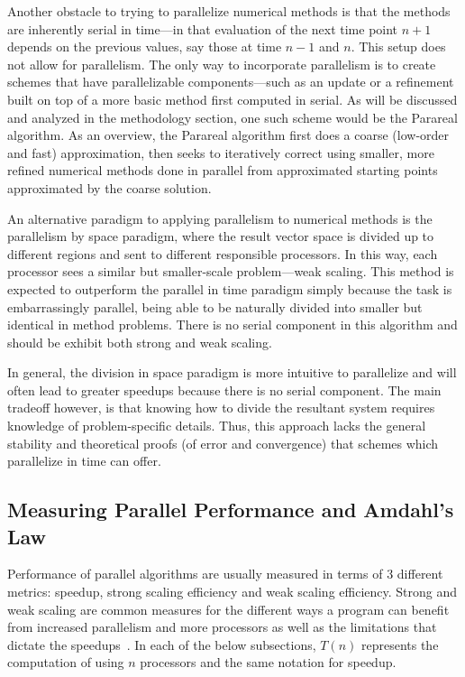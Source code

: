 \documentclass[letterpaper,12pt]{article}
\begin{document}
Another obstacle to trying to parallelize numerical methods is that the methods
are inherently serial in time---in that evaluation of the next time point $n+1$
depends on the previous values, say those at time $n-1$ and $n$. This setup
does not allow for parallelism. The only way to incorporate parallelism is to
create schemes that have parallelizable components---such as an update or a
refinement built on top of a more basic method first computed in serial. As will be discussed and analyzed in the
methodology section, one such scheme would be the Parareal algorithm. As an
overview, the Parareal algorithm first does a coarse (low-order and fast)
approximation, then seeks to iteratively correct using smaller, more refined
numerical methods done in parallel from approximated starting points
approximated by the coarse solution.

An alternative paradigm to applying parallelism to numerical methods is the
parallelism by space paradigm, where the result vector space is divided up to
different regions and sent to different responsible processors. In this way,
each processor sees a similar but smaller-scale problem---weak scaling. This
method is expected to outperform the parallel in time paradigm simply because
the task is embarrassingly parallel, being able to be naturally divided
into smaller but identical in method problems. There is no serial component in
this algorithm and should be exhibit both strong and weak scaling.

In general, the division in space paradigm is more intuitive to parallelize and
will often lead to greater speedups because there is no serial component. The main tradeoff however, is that knowing how to divide the resultant system requires knowledge of problem-specific details. Thus, this approach lacks the
general stability and theoretical proofs (of error and convergence) that schemes which parallelize in
time can offer.

\subsection{Measuring Parallel Performance and Amdahl's Law}

Performance of parallel algorithms are usually measured in terms of 3 different
metrics: speedup, strong scaling efficiency and weak scaling efficiency.
Strong and weak scaling are common measures for the different ways a program can
benefit from increased parallelism and more processors as well as the
limitations that dictate the speedups~\cite{parallelscaling}. In each of the below subsections, $T(n)$ represents the computation of using $n$ processors and the same notation for speedup.
\end{document}
